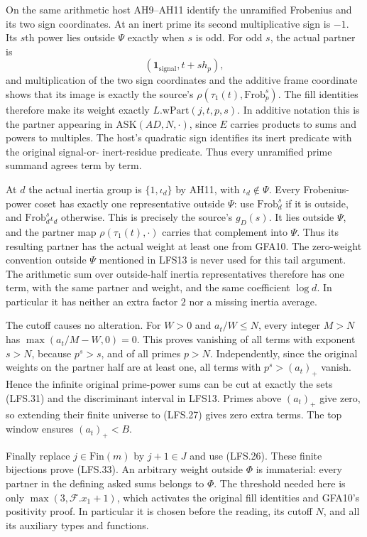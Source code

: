 On the same arithmetic host AH9--AH11 identify the unramified
Frobenius and its two sign coordinates.  At an inert prime
its second multiplicative sign is $-1$.  Its $s$th power
lies outside $\Psi$ exactly when $s$ is odd.  For odd $s$,
the actual partner is
\[
 (\mathbf1_{\mathrm{signal}},t+s h_p),
\]
and multiplication of the two sign coordinates and the
additive frame coordinate shows that its image is exactly
the source's $\rho(\tau_1(t),\mathrm{Frob}_p^s)$.
The fill identities therefore make its weight exactly
$L.\mathrm{wPart}(j,t,p,s)$.
In additive notation this is the partner appearing in
$\mathrm{ASK}(AD,N,\cdot)$, since $E$ carries products to
sums and powers to multiples.  The host's quadratic sign
identifies its inert predicate with the original signal-or-
inert-residue predicate.  Thus every unramified prime summand
agrees term by term.

At $d$ the actual inertia group is
$\{1,\iota_d\}$ by AH11, with $\iota_d\notin\Psi$.
Every Frobenius-power coset has exactly one representative
outside $\Psi$: use $\mathrm{Frob}_d^s$ if it is outside,
and $\mathrm{Frob}_d^s\iota_d$ otherwise.
This is precisely the source's $g_D(s)$.  It lies outside
$\Psi$, and the partner map $\rho(\tau_1(t),\cdot)$ carries
that complement into $\Psi$.  Thus its resulting partner has
the actual weight at least one from GFA10.  The zero-weight
convention outside $\Psi$ mentioned in LFS13 is never used
for this tail argument.
The arithmetic sum over outside-half inertia representatives
therefore has one term, with the same partner and weight,
and the same coefficient $\log d$.  In particular it has
neither an extra factor $2$ nor a missing inertia average.

The cutoff causes no alteration.  For $W>0$ and
$a_t/W\le N$, every integer $M>N$ has
$\max(a_t/M-W,0)=0$.
This proves vanishing of all terms with exponent $s>N$,
because $p^s>s$, and of all primes $p>N$.
Independently, since the original weights on the partner
half are at least one, all terms with $p^s>(a_t)_+$ vanish.
Hence the infinite original prime-power sums can be cut
at exactly the sets (LFS.31) and the discriminant interval
in LFS13.  Primes above $(a_t)_+$ give zero, so extending
their finite universe to (LFS.27) gives zero extra terms.
The top window ensures $(a_t)_+<B$.

Finally replace $j\in\mathrm{Fin}(m)$ by $j+1\in J$
and use (LFS.26).  These finite bijections prove (LFS.33).
An arbitrary weight outside $\Phi$ is immaterial: every
partner in the defining asked sums belongs to $\Phi$.
The threshold needed here is only
$\max(3,\mathcal F.x_1+1)$, which activates the original
fill identities and GFA10's positivity proof.  In particular
it is chosen before the reading, its cutoff $N$, and all its
auxiliary types and functions.

